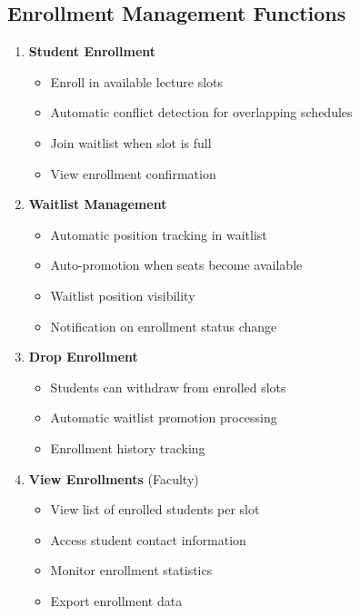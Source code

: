 \subsection{Enrollment Management Functions}

\begin{enumerate}[leftmargin=*]
    \item \textbf{Student Enrollment}
    \begin{itemize}
        \item Enroll in available lecture slots
        \item Automatic conflict detection for overlapping schedules
        \item Join waitlist when slot is full
        \item View enrollment confirmation
    \end{itemize}
    
    \item \textbf{Waitlist Management}
    \begin{itemize}
        \item Automatic position tracking in waitlist
        \item Auto-promotion when seats become available
        \item Waitlist position visibility
        \item Notification on enrollment status change
    \end{itemize}
    
    \item \textbf{Drop Enrollment}
    \begin{itemize}
        \item Students can withdraw from enrolled slots
        \item Automatic waitlist promotion processing
        \item Enrollment history tracking
    \end{itemize}
    
    \item \textbf{View Enrollments} (Faculty)
    \begin{itemize}
        \item View list of enrolled students per slot
        \item Access student contact information
        \item Monitor enrollment statistics
        \item Export enrollment data
    \end{itemize}
\end{enumerate}

